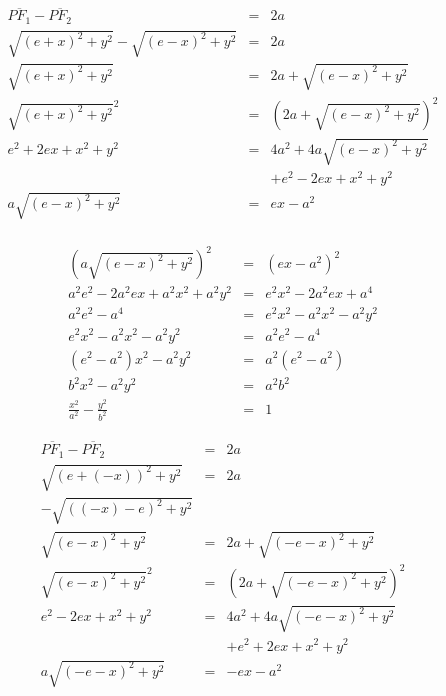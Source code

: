 \begin{frame}
\begin{displaymath}
	\begin{array}{rcl}
		\overline{{PF}_1} - \overline{{PF}_2} & = & 2a\\
		\sqrt{{(e+x)}^2 + y^2} - \sqrt{{(e-x)}^2 + y^2} & = & 2a\\
		\sqrt{{(e+x)}^2 + y^2} & = & 2a + \sqrt{{(e-x)}^2 + y^2}\\
		\sqrt{{(e+x)}^2 + y^2}^2 & = & \left (2a + \sqrt{{(e-x)}^2 + y^2}\right )^2\\
		e^2 + 2ex + x^2 + y^2 & = & 4a^2 + 4a \sqrt{(e-x)^2+y^2}\\
		&& + e^2 - 2ex + x^2 + y^2\\
		a\sqrt{{(e-x)}^2 + y^2} & = & ex - a^2\\
	\end{array}
\end{displaymath}
\end{frame}

\begin{frame}
\begin{displaymath}
	\begin{array}{rcl}
		\left (a\sqrt{{(e-x)}^2 + y^2}\right )^2 & = & \left(ex - a^2\right)^2\\
		a^2e^2 - 2a^2ex + a^2x^2 + a^2y^2 &=& e^2x^2 - 2a^2ex + a^4\\
		a^2e^2 - a^4 &=& e^2x^2 - a^2x^2 - a^2y^2\\
		e^2x^2 - a^2x^2 - a^2y^2 &=& a^2e^2 - a^4\\
		\left(e^2 - a^2\right)x^2 - a^2y^2 &=& a^2\left(e^2 - a^2\right)\\
		b^2x^2 - a^2y^2 &=& a^2b^2\\
		\frac{x^2}{a^2} - \frac{y^2}{b^2} &=& 1
	\end{array}
\end{displaymath}
\end{frame}

\begin{frame}
\begin{displaymath}
	\begin{array}{rcl}
		\overline{{PF}_1} - \overline{{PF}_2} & = & 2a\\
		\sqrt{{(e+(-x))}^2 + y^2} & = & 2a\\
		- \sqrt{{((-x)-e)}^2 + y^2} &&\\
		\sqrt{{(e-x)}^2 + y^2} & = & 2a + \sqrt{{(-e-x)}^2 + y^2}\\
		\sqrt{{(e-x)}^2 + y^2}^2 & = & \left (2a + \sqrt{{(-e-x)}^2 + y^2}\right )^2\\
		e^2 - 2ex + x^2 + y^2 & = & 4a^2 + 4a \sqrt{(-e-x)^2+y^2}\\
		&& + e^2 + 2ex + x^2 + y^2\\
		a\sqrt{{(-e-x)}^2 + y^2} & = & -ex - a^2\\
	\end{array}
\end{displaymath}
\end{frame}

